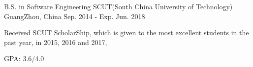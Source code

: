 \begin{cventries}
  \cventry
    {B.S. in Software Engineering}
    {SCUT(South China University of Technology)}
    {GuangZhou, China}
    {Sep. 2014 - Exp. Jun. 2018}
    {
      \begin{cvitems}
        \item {Received SCUT ScholarShip, which is given to the most excellent students in the past year, in 2015, 2016 and 2017,}
        \item {GPA: 3.6/4.0}
      \end{cvitems}
    }
\end{cventries}
